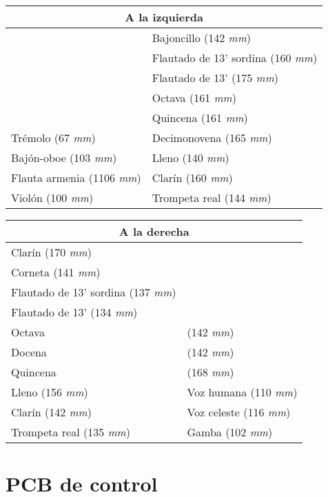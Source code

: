 \begin{center}
	\begin{tabular}{|l|l|}
		\hline \multicolumn{2}{|c|}{\textbf{A la izquierda}} \\	
		\hline & Bajoncillo (142 \textit{mm}) \\ 
		\hline & Flautado de 13' sordina (160 \textit{mm}) \\ 
		\hline & Flautado de 13' (175 \textit{mm})\\ 
		\hline & Octava (161 \textit{mm}) \\ 
		\hline & Quincena (161 \textit{mm}) \\ 
		\hline Trémolo (67 \textit{mm}) & Decimonovena (165 \textit{mm}) \\ 
		\hline Bajón-oboe (103 \textit{mm}) & Lleno (140 \textit{mm})  \\ 
		\hline Flauta armenia (1106 \textit{mm}) & Clarín (160 \textit{mm}) \\ 
		\hline  Violón (100 \textit{mm}) & Trompeta real (144 \textit{mm})  \\ 
		\hline
	\end{tabular}
	
	\begin{tabular}{|l|l|}
		\hline \multicolumn{2}{|c|}{\textbf{A la derecha}} \\
		\hline Clarín (170 \textit{mm}) &  \\ 
		\hline Corneta (141 \textit{mm}) &  \\ 
		\hline Flautado de 13' sordina (137 \textit{mm}) &  \\ 
		\hline Flautado de 13' (134 \textit{mm}) &  \\ 
		\hline Octava & (142 \textit{mm}) \\ 
		\hline Docena & (142 \textit{mm}) \\ 
		\hline Quincena & (168 \textit{mm}) \\ 
		\hline Lleno (156 \textit{mm}) & Voz humana (110 \textit{mm}) \\ 
		\hline Clarín (142 \textit{mm}) & Voz celeste (116 \textit{mm}) \\ 
		\hline Trompeta real (135 \textit{mm}) & Gamba (102 \textit{mm}) \\ 
		\hline 
	\end{tabular}
\end{center}

\smallskip

\section{PCB de control}

